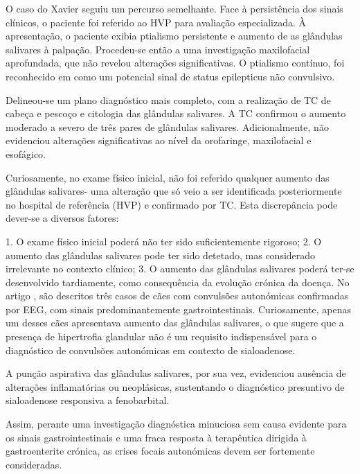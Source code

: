 O caso do Xavier seguiu um percurso semelhante. Face à persistência dos sinais clínicos, o paciente foi referido ao HVP para avaliação especializada. À apresentação, o paciente exibia ptialismo persistente e aumento de as glândulas salivares à palpação. Procedeu-se então a uma investigação maxilofacial aprofundada, que não revelou alterações significativas.  O ptialismo contínuo, foi reconhecido em \cite{Diop2025} como um potencial sinal de status epilepticus não convulsivo.


 Delineou-se um plano diagnóstico mais completo, com a realização de TC de cabeça e pescoço e citologia das glândulas salivares. A TC confirmou o aumento moderado a severo de três pares de glândulas salivares.  Adicionalmente, não evidenciou alterações significativas ao nível da orofaringe, maxilofacial e esofágico.


Curiosamente, no exame físico inicial, não foi referido qualquer aumento das glândulas salivares- uma alteração que só veio a ser identificada posteriormente no hospital de referência (HVP) e confirmado por TC. Esta discrepância pode dever-se a diversos fatores: 


1.	O exame físico inicial poderá não ter sido suficientemente rigoroso; 
2.	O aumento das glândulas salivares pode ter sido detetado, mas considerado irrelevante no contexto clínico;
3.	O aumento das glândulas salivares poderá ter-se desenvolvido tardiamente, como consequência da evolução crónica da doença. No artigo \cite{Diop2025}, são descritos três casos de cães com convulsões autonómicas confirmadas por EEG, com sinais predominantemente gastrointestinais. Curiosamente, apenas um desses cães apresentava aumento das glândulas salivares, o que sugere que a presença de hipertrofia glandular não é um requisito indispensável para o diagnóstico de convulsões autonómicas em contexto de sialoadenose.


A punção aspirativa das glândulas salivares, por sua vez, evidenciou ausência de alterações inflamatórias ou neoplásicas, sustentando o diagnóstico presuntivo de sialoadenose responsiva a fenobarbital. 


Assim, perante uma investigação diagnóstica minuciosa sem causa evidente para os sinais gastrointestinais e uma fraca resposta à terapêutica dirigida à gastroenterite crónica, as crises focais autonómicas devem ser fortemente consideradas. \cite{Diop2025}



